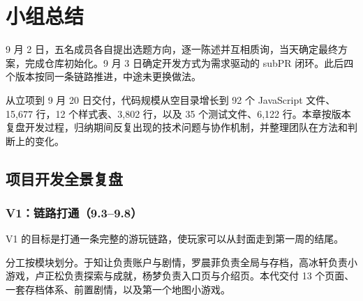 %
%
%

\chapter{小组总结}

9 月 2 日，五名成员各自提出选题方向，逐一陈述并互相质询，当天确定最终方案，完成仓库初始化。9 月 3 日确定开发方式为需求驱动的 subPR 闭环。此后四个版本按同一条链路推进，中途未更换做法。

从立项到 9 月 20 日交付，代码规模从空目录增长到 92 个 JavaScript 文件、15{,}677 行，12 个样式表、3{,}802 行，以及 35 个测试文件、6{,}122 行。本章按版本复盘开发过程，归纳期间反复出现的技术问题与协作机制，并整理团队在方法和判断上的变化。

\section{项目开发全景复盘}

\subsection{V1：链路打通（9.3--9.8）}

V1 的目标是打通一条完整的游玩链路，使玩家可以从封面走到第一周的结尾。

分工按模块划分。于知让负责账户与剧情，罗晨菲负责全局与存档，高冰轩负责小游戏，卢正松负责探索与成就，杨梦负责入口页与介绍页。本代交付 13 个页面、一套存档体系、前置剧情，以及第一个地图小游戏。

